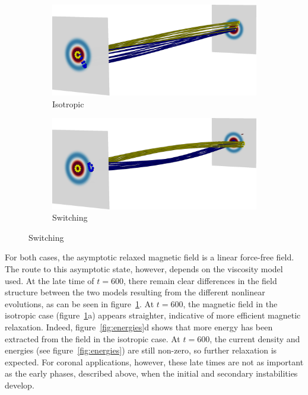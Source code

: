 \begin{figure}[t]
  \centering
  \begin{subfigure}[b]{0.48\textwidth}
    \includegraphics[width=\linewidth]{field_line_plots/cropped/v1e-4r5e-4.5-isotropic_0062_cropped.png}
    \caption{Isotropic}
  \end{subfigure}
  \begin{subfigure}[b]{0.48\textwidth}
    \includegraphics[width=\linewidth]{field_line_plots/cropped/v1e-4r5e-4.5-switching_0059_cropped.png}
    \caption{Switching}
  \end{subfigure}
\label{fig:finale-field-lines}
\end{figure}

For both cases, the asymptotic relaxed magnetic field is a linear force-free field. The route to this asymptotic state, however, depends on the viscosity model used. At the late time of $t=600$, there remain clear differences in the field structure between the two models resulting from the different nonlinear evolutions, as can be seen in figure~\ref{fig:finale-field-lines}. At $t=600$, the magnetic field in the isotropic case (figure~\ref{fig:finale-field-lines}a) appears straighter, indicative of more efficient magnetic relaxation. Indeed, figure~\ref{fig:energies}d shows that more energy has been extracted from the field in the isotropic case. At $t=600$, the current density and energies (see figure~\ref{fig:energies}) are still non-zero, so further relaxation is expected. For coronal applications, however, these late times are not as important as the early phases, described above, when the initial and secondary instabilities develop.

